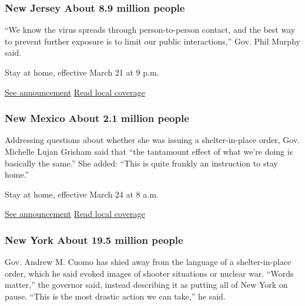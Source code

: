 \hypertarget{new-jersey-about-89-million-people}{%
\subsubsection{New Jersey About 8.9 million
people}\label{new-jersey-about-89-million-people}}

``We know the virus spreads through person-to-person contact, and the
best way to prevent further exposure is to limit our public
interactions,'' Gov. Phil Murphy said.

Stay at home, effective March 21 at 9 p.m.

\href{https://nj.gov/infobank/eo/056murphy/pdf/EO-107.pdf}{See
announcement} \textbar{}
\href{https://www.nj.com/coronavirus/2020/03/new-jersey-lockdown-rules-what-residents-need-to-know-about-stay-at-home-order.html}{Read
local coverage}

\hypertarget{new-mexico-about-21-million-people}{%
\subsubsection{New Mexico About 2.1 million
people}\label{new-mexico-about-21-million-people}}

Addressing questions about whether she was issuing a shelter-in-place
order, Gov. Michelle Lujan Grisham said that ``the tantamount effect of
what we're doing is basically the same.'' She added: ``This is quite
frankly an instruction to stay home.''

Stay at home, effective March 24 at 8 a.m.

\href{https://www.governor.state.nm.us/wp-content/uploads/2020/03/COVID-19-DOH-Order-fv.pdf}{See
announcement} \textbar{}
\href{https://www.abqjournal.com/1435599/lujan-grisham-to-announce-stay-at-home-instruction.html}{Read
local coverage}

\hypertarget{new-york-about-195-million-people}{%
\subsubsection{New York About 19.5 million
people}\label{new-york-about-195-million-people}}

Gov. Andrew M. Cuomo has shied away from the language of a
shelter-in-place order, which he said evoked images of shooter
situations or nuclear war. ``Words matter,'' the governor said, instead
describing it as putting all of New York on pause. ``This is the most
drastic action we can take,'' he said.

